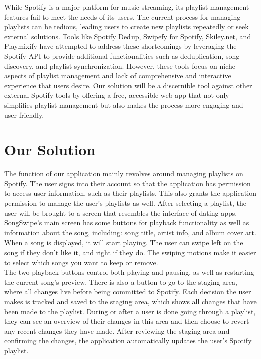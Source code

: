 \documentclass{article}
\begin{document}
While Spotify is a major platform for music streaming, its playlist management features fail to meet the needs of its users. The current process for managing playlists can be tedious, leading users to create new playlists repeatedly or seek external solutions. Tools like Spotify Dedup, Swipefy for Spotify, Skiley.net, and Playmixify have attempted to address these shortcomings by leveraging the Spotify API to provide additional functionalities such as deduplication, song discovery, and playlist synchronization. However, these tools focus on niche aspects of playlist management and lack of comprehensive and interactive experience that users desire. Our solution will be a discernible tool against other external Spotify tools by offering a free, accessible web app that not only simplifies playlist management but also makes the process more engaging and user-friendly.
 

\section{Our Solution}
\quad The function of our application mainly revolves around managing playlists on Spotify. The user signs into their account so that the application has permission to access user information, such as their playlists. This also grants the application permission to manage the user's playlists as well. After selecting a playlist, the user will be brought to a screen that resembles the interface of dating apps. SongSwipe's main screen has some buttons for playback functionality as well as information about the song, including: song title, artist info, and album cover art. When a song is displayed, it will start playing. The user can swipe left on the song if they don't like it, and right if they do. The swiping motions make it easier to select which songs you want to keep or remove.\\

\quad The two playback buttons control both playing and pausing, as well as restarting the current song's preview.  There is also a button to go to the staging area, where all changes live before being committed to Spotify. Each decision the user makes is tracked and saved to the staging area, which shows all changes that have been made to the playlist. During or after a user is done going through a playlist, they can see an overview of their changes in this area and then choose to revert any recent changes they have made. After reviewing the staging area and confirming the changes, the application automatically updates the user's Spotify playlist. \\
\end{document}
